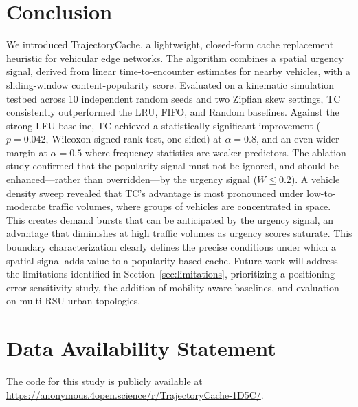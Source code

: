 \documentclass[preprint,12pt]{elsarticle}
\begin{document}
	\section{Conclusion}

	\label{sec:conclusion}
	
	We introduced TrajectoryCache, a lightweight, closed-form cache replacement heuristic for vehicular edge networks. The algorithm combines a spatial urgency signal, derived from linear time-to-encounter estimates for nearby vehicles, with a sliding-window content-popularity score. Evaluated on a kinematic simulation testbed across 10 independent random seeds and two Zipfian skew settings, TC consistently outperformed the LRU, FIFO, and Random baselines. Against the strong LFU baseline, TC achieved a statistically significant improvement ($p = 0.042$, Wilcoxon signed-rank test, one-sided) at $\alpha = 0.8$, and an even wider margin at $\alpha = 0.5$ where frequency statistics are weaker predictors. The ablation study confirmed that the popularity signal must not be ignored, and should be enhanced---rather than overridden---by the urgency signal ($W \leq 0.2$). A vehicle density sweep revealed that TC's advantage is most pronounced under low-to-moderate traffic volumes, where groups of vehicles are concentrated in space. This creates demand bursts that can be anticipated by the urgency signal, an advantage that diminishes at high traffic volumes as urgency scores saturate. This boundary characterization clearly defines the precise conditions under which a spatial signal adds value to a popularity-based cache. Future work will address the limitations identified in Section~\ref{sec:limitations}, prioritizing a positioning-error sensitivity study, the addition of mobility-aware baselines, and evaluation on multi-RSU urban topologies.

	\section*{Data Availability Statement}
	The code for this study is publicly available at \url{https://anonymous.4open.science/r/TrajectoryCache-1D5C/}.

	
	
	
	
\end{document}
